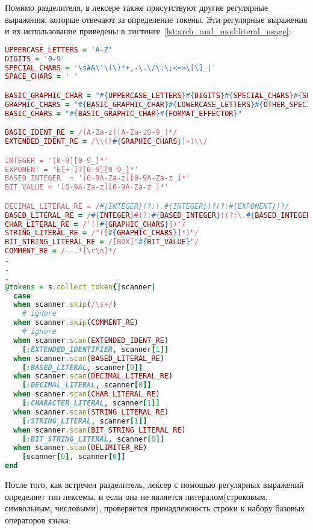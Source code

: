 Помимо разделителя, в лексере также присутствуют другие регулярные выражения, которые отвечают за определение токены. Эти регулярные выражения и их использование приведены в листинге~\ref{lst:arch_and_mod:literal_usage}:
\begin{lstlisting}[language=Ruby, style=rubystyle,caption={Определение и использование регулярных выражений для опознавания токена}, label=lst:arch_and_mod:literal_usage]
UPPERCASE_LETTERS = 'A-Z'
DIGITS = '0-9'
SPECIAL_CHARS = '\s#&\'\(\)*+,-\.\/\:\;<=>\[\]_|'
SPACE_CHARS = ' '

BASIC_GRAPHIC_CHAR = "#{UPPERCASE_LETTERS}#{DIGITS}#{SPECIAL_CHARS}#{SPACE_CHARS}"
GRAPHIC_CHARS = "#{BASIC_GRAPHIC_CHAR}#{LOWERCASE_LETTERS}#{OTHER_SPECIAL_CHARS}"
BASIC_CHARS = "#{BASIC_GRAPHIC_CHAR}#{FORMAT_EFFECTOR}"

BASIC_IDENT_RE = /[A-Za-z][A-Za-z0-9_]*/
EXTENDED_IDENT_RE = /\\([#{GRAPHIC_CHARS}]+)\\/

INTEGER = '[0-9][0-9_]*'
EXPONENT = 'E[+-]?[0-9][0-9_]*'
BASED_INTEGER  = '[0-9A-Za-z][0-9A-Za-z_]*'
BIT_VALUE = '[0-9A-Za-z][0-9A-Za-z_]*'

DECIMAL_LITERAL_RE = /#{INTEGER}(?:\.#{INTEGER})?(?:#{EXPONENT})?/
BASED_LITERAL_RE = /#{INTEGER}#(?:#{BASED_INTEGER})(?:\.#{BASED_INTEGER})?#(?:#{EXPONENT})?/
CHAR_LITERAL_RE = /'([#{GRAPHIC_CHARS}])'/
STRING_LITERAL_RE = /"([#{GRAPHIC_CHARS}]*)"/
BIT_STRING_LITERAL_RE = /[BOX]"#{BIT_VALUE}"/
COMMENT_RE = /--.*[\r\n]*/
.
.
.
@tokens = s.collect_token{|scanner|
  case
  when scanner.skip(/\s+/)
    # ignore
  when scanner.skip(COMMENT_RE)
    # ignore
  when scanner.scan(EXTENDED_IDENT_RE)
    [:EXTENDED_IDENTIFIER, scanner[1]]
  when scanner.scan(BASED_LITERAL_RE)
    [:BASED_LITERAL, scanner[0]]
  when scanner.scan(DECIMAL_LITERAL_RE)
    [:DECIMAL_LITERAL, scanner[0]]
  when scanner.scan(CHAR_LITERAL_RE)
    [:CHARACTER_LITERAL, scanner[1]]
  when scanner.scan(STRING_LITERAL_RE)
    [:STRING_LITERAL, scanner[1]]
  when scanner.scan(BIT_STRING_LITERAL_RE)
    [:BIT_STRING_LITERAL, scanner[0]]
  when scanner.scan(DELIMITER_RE)
    [scanner[0], scanner[0]]
end
\end{lstlisting}
После того, как встречен разделитель, лексер с помощью регулярных выражений определяет тип лексемы, и если она не является литералом(строковым, символьным, числовыми), проверяется принадлежность строки к набору базовых операторов языка:

